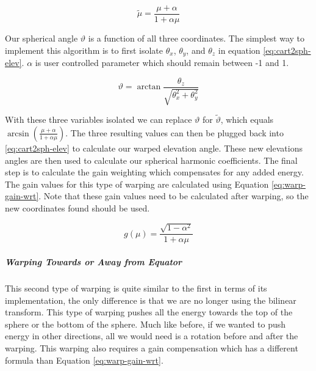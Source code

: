 $$
\tilde{\mu}=\frac{\mu+\alpha}{1+\alpha \mu}
$$

Our spherical angle $\vartheta$ is a function of all three coordinates. The simplest way to implement this algorithm is to first isolate $\theta_{x}$, $\theta_{y}$, and $\theta_{z}$ in equation \ref{eq:cart2sph-elev}. $\alpha$ is user controlled parameter which should remain between -1 and 1.

\begin{equation}
\vartheta=\arctan \frac{\theta_{z}}{\sqrt{\theta_{x}^{2}+\theta_{y}^{2}}}
\label{eq:cart2sph-elev}
\end{equation}

With these three variables isolated we can replace $\vartheta$ for $\tilde{\vartheta}$, which equals $\arcsin \left(\frac{\mu+\alpha}{1+\alpha \mu}\right)$. The three resulting values can then be plugged back into \ref{eq:cart2sph-elev} to calculate our warped elevation angle. These new elevations angles are then used to calculate our spherical harmonic coefficients. The final step is to calculate the gain weighting which compensates for any added energy. The gain values for this type of warping are calculated using Equation \ref{eq:warp-gain-wrt}. Note that these gain values need to be calculated after warping, so the new coordinates found should be used. 

\begin{equation}
g(\mu)=\frac{\sqrt{1-\alpha^{2}}}{1+\alpha \mu}
\label{eq:warp-gain-wrt}
\end{equation}


\subparagraph{Warping Towards or Away from Equator}

This second type of warping is quite similar to the first in terms of its implementation, the only difference is that we are no longer using the bilinear transform. This type of warping pushes all the energy towards the top of the sphere or the bottom of the sphere. Much like before, if we wanted to push energy in other directions, all we would need is a rotation before and after the warping. This warping also requires a gain compensation which has a different formula than Equation \ref{eq:warp-gain-wrt}.


